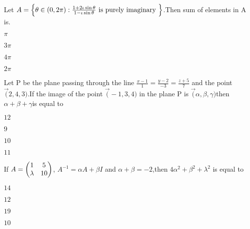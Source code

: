 \iffalse
  \title{Assignment}
  \author{EE24BTECH11026}
  \section{mcq-single}
\fi

    \item 
        Let $A= \left\{\theta \in \left(0,2\pi\right):\frac{1+2\iota\sin{\theta}}{1-\iota\sin{\theta}} \text{ is purely imaginary }\right\}$.Then sum of elements in A is. 
        \hfill{}
               \begin{enumerate}
               \begin{multicols}{4}
                \item $\pi$
                \item $3\pi$                 
                \item $4\pi$               
                \item $2\pi$
                \end{multicols}
            \end{enumerate}
            
	\item Let P be the plane passing through the line $\frac{x-1}{1}= \frac{y-2}{-3}= \frac{z+5}{7}$ and the point $\vec (2,4,3)$.If the image of the point $\vec(-1,3,4)$ in the plane P is $\vec(\alpha,\beta,\gamma)$then $\alpha+\beta+\gamma$is equal to
        \hfill{}
                \begin{enumerate}
                \begin{multicols}{4}
                \item $12$
                \item $9$
                \item $10$ 
                \item $11$
                \end{multicols}
            \end{enumerate} 
            
	\item If $A=\begin{pmatrix}1 & 5 \\ \lambda & 10\end{pmatrix}$, $A^{-1}=\alpha A+\beta I$ and $\alpha+\beta=-2$,then $4\alpha^2+\beta^2+\lambda^2$ is equal to
        \hfill{}
        \begin{enumerate}    
        \begin{multicols}{4}
                \item $14$
                \item $12$
                \item $19$
                \item $10$
                \end{multicols}
       \end{enumerate}
       
